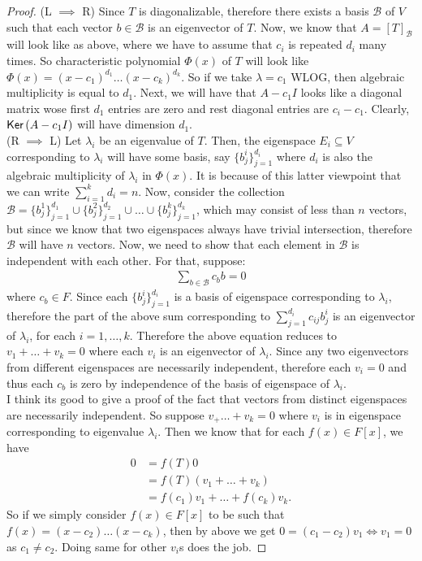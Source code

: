 \documentclass[letterpaper,11pt,twoside]{article}
\theoremstyle{definition}
\theoremstyle{definition}
\theoremstyle{definition}
\theoremstyle{definition}
\theoremstyle{definition}
\theoremstyle{definition}
\theoremstyle{remark}
\theoremstyle{definition}
\newcommand{\Ker}[1]{{\fontfamily{lmss}\selectfont 
		\text{Ker}\left (#1\right )
}}
\begin{document}
    \begin{proof}
        (L $\implies $ R) Since $T$ is diagonalizable, therefore there exists a basis $\mathcal{B}$ of $V$ such that each vector $b\in \mathcal{B}$ is an eigenvector of $T$. Now, we know that $A = [T]_\mathcal{B}$ will look like as above, where we have to assume that $c_i$ is repeated $d_i$ many times. So characteristic polynomial $\Phi(x)$ of $T$ will look like $\Phi(x) = (x-c_1)^{d_1} \dots (x-c_k)^{d_k}$. So if we take $\lambda = c_1 $ WLOG, then algebraic multiplicity is equal to $d_1$. Next, we will have that $A-c_1I$ looks like a diagonal matrix wose first $d_1$ entries are zero and rest diagonal entries are $c_i - c_1$. Clearly, $\Ker{A-c_1I}$ will have dimension $d_1$.\\
        
        (R $\implies$ L) Let $\lambda_i$ be an eigenvalue of $T$. Then, the eigenspace $E_i \subseteq V$ corresponding to $\lambda_i$ will have some basis, say $\{b^i_j\}_{j=1}^{d_i}$ where $d_i$ is also the algebraic multiplicity of $\lambda_i$ in $\Phi(x)$. It is because of this latter viewpoint that we can write $\sum_{i=1}^k d_i = n$. Now, consider the collection $\mathcal{B} = \{b^1_j\}_{j=1}^{d_1} \cup \{b^2_j\}_{j=1}^{d_2} \cup \dots \cup \{b^k_j\}_{j=1}^{d_k}$, which may consist of less than $n$ vectors, but since we know that two eigenspaces always have trivial intersection, therefore $\mathcal{B}$ will have $n$ vectors. Now, we need to show that each element in $\mathcal{B}$ is independent with each other. For that, suppose:
        \begin{align*}
            \sum_{b\in \mathcal{B}} c_b b = 0
        \end{align*}
        where $c_b \in F$. Since each $\{b^i_j\}_{j=1}^{d_i}$ is a basis of eigenspace corresponding to $\lambda_i$, therefore the part of the above sum corresponding to $\sum_{j=1}^{d_i} c_{ij} b^i_j $ is an eigenvector of $\lambda_i$, for each $i=1,\dots,k$. Therefore the above equation reduces to $v_1 + \dots + v_k = 0$ where each $v_i$ is an eigenvector of $\lambda_i$. Since any two eigenvectors from different eigenspaces are necessarily independent, therefore each $v_i = 0$ and thus each $c_b$ is zero by independence of the basis of eigenspace of $\lambda_i$.\\
        
        I think its good to give a proof of the fact that vectors from distinct eigenspaces are necessarily independent. So suppose $v_ + \dots + v_k =0$ where $v_i $ is in eigenspace corresponding to eigenvalue $\lambda_i$. Then we know that for each $f(x) \in F[x]$, we have
        \begin{align*}
            0 &= f(T)0\\
            &= f(T)(v_1+\dots + v_k)\\
            &= f(c_1)v_1 + \dots + f(c_k) v_k.
        \end{align*}
        So if we simply consider $f(x) \in F[x]$ to be such that $f(x) = (x-c_2) \dots (x-c_k)$, then by above we get $0 = (c_1-c_2)v_1 \iff v_1 = 0$ as $c_1 \neq c_2$. Doing same for other $v_i$s does the job. 
    \end{proof}
\end{document}
